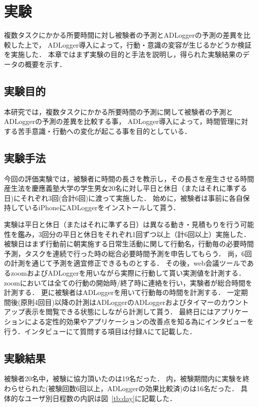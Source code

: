 \chapter{実験}
複数タスクにかかる所要時間に対し被験者の予測とADLoggerの予測の差異を比較した上で，
ADLogger導入によって，行動・意識の変容が生じるかどうか検証を実施した．
本章ではまず実験の目的と手法を説明し，得られた実験結果のデータの概要を示す．

\section{実験目的}
本研究では，複数タスクにかかる所要時間の予測に関して被験者の予測とADLoggerの予測の差異を比較する事，
ADLogger導入によって，時間管理に対する苦手意識・行動への変化が起こる事を目的としている．

\section{実験手法}
今回の評価実験では，被験者に時間の長さを教示し，その長さを産生させる時間産生法\cite{Oguro1961}\cite{Tayama2018}を慶應義塾大学の学生男女20名に対し平日と休日（またはそれに準ずる日)にそれぞれ3回(合計6回)に渡って実施した．
始めに，被験者は事前に各自保持しているiPhoneにADLoggerをインストールして貰う．

実験は平日と休日（またはそれに準ずる日）は異なる動き・見積もりを行う可能性を鑑み，3回分の平日と休日をそれぞれ1回ずつ以上（計6回以上）実施した．
被験日はまず行動前に朝実施する日常生活動に関して行動名，行動毎の必要時間予測，タスクを連続で行った時の総合必要時間予測を申告してもらう．
尚，6回の計測を通じて予測を適宜修正できるものとする．
その後，web会議ツールであるzoom\cite{zoom}およびADLoggerを用いながら実際に行動して貰い実測値を計測する．
zoomにおいては全ての行動の開始時/終了時に連絡を行い，実験者が総合時間を計測する．
更に被験者はADLoggerを用いて行動毎の時間を計測する．
一定期間後(原則4回目)以降の計測はADLoggerのADLoggerおよびタイマーのカウントアップ表示を閲覧できる状態にしながら計測して貰う．
最終日にはアプリケーションによる定性的効果やアプリケーションの改善点を知る為にインタビューを行う．インタビューにて質問する項目は付録Aにて記載した．

\section{実験結果}
被験者20名中，被験に協力頂いたのは19名だった．
内，被験期間内に実験を終わらせられた(被験回数6回以上，ADLoggerの効果比較済)のは16名だった．
具体的なユーザ別日程数の内訳は図~\ref{tb:day}に記載した．

